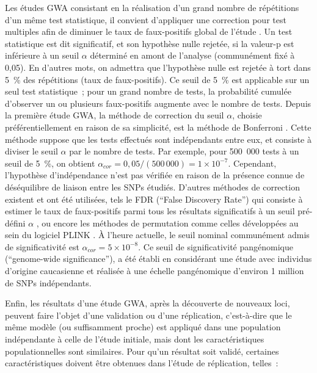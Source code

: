 \documentclass[11pt,a4paper,notrimn]{krantz}
\theoremstyle{definition}
\theoremstyle{definition}
\theoremstyle{remark}
\begin{document}
Les études GWA consistant en la réalisation d'un grand nombre de
répétitions d'un même test statistique, il convient d'appliquer une
correction pour test multiples afin de diminuer le taux de faux-positifs
global de l'étude \citep{pearson_how_2008}. Un test statistique est dit
significatif, et son hypothèse nulle rejetée, si la valeur-p est
inférieure à un seuil \(\alpha\) déterminé en amont de l'analyse
(communément fixé à 0,05). En d'autres mots, on admettra que l'hypothèse
nulle est rejetée à tort dans 5~\% des répétitions (taux de
faux-positifs). Ce seuil de 5~\% est applicable sur un seul test
statistique~; pour un grand nombre de tests, la probabilité cumulée
d'observer un ou plusieurs faux-positifs augmente avec le nombre de
tests. Depuis la première étude GWA, la méthode de correction du seuil
\(\alpha\), choisie préférentiellement en raison de sa simplicité, est
la méthode de Bonferroni \citep{dunn_multiple_2012}. Cette méthode
suppose que les tests effectués sont indépendants entre eux, et consiste
à diviser le seuil \(\alpha\) par le nombre de tests. Par exemple, pour
500~000 tests à un seuil de 5~\%, on obtient
\(\alpha_{cor}=0,05/(500\,000)=1\times 10^{-7}\). Cependant, l'hypothèse
d'indépendance n'est pas vérifiée en raison de la présence connue de
déséquilibre de liaison entre les SNPs étudiés. D'autres méthodes de
correction existent et ont été utilisées, tels le FDR (``False Discovery
Rate'') qui consiste à estimer le taux de faux-positifs parmi tous les
résultats significatifs à un seuil pré-défini \(\alpha\)
\citep{hochberg_more_1990, van_den_oord_controlling_2008}, ou encore les
méthodes de permutation comme celles développées au sein du logiciel
PLINK \citep{chang_second-generation_2015, purcell_plink_2015}. À
l'heure actuelle, le seuil nominal communément admis de significativité
est \(\alpha_{cor}=5\times 10^{-8}\). Ce seuil de significativité
pangénomique (``genome-wide significance''), a été établi en considérant
une étude avec individus d'origine caucasienne
\citep{dudbridge_estimation_2008} et réalisée à une échelle pangénomique
d'environ 1 million de SNPs indépendants.

Enfin, les résultats d'une étude GWA, après la découverte de nouveaux
loci, peuvent faire l'objet d'une validation ou d'une réplication,
c'est-à-dire que le même modèle (ou suffisamment proche) est appliqué
dans une population indépendante à celle de l'étude initiale, mais dont
les caractéristiques populationnelles sont similaires. Pour qu'un
résultat soit validé, certaines caractéristiques doivent être obtenues
dans l'étude de réplication, telles~:
\end{document}
